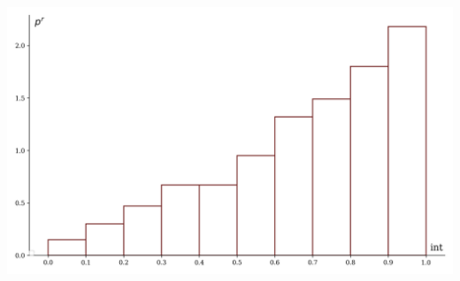 \documentclass[a4paper, 14pt]{extarticle}
\begin{document}
\begin{minipage}[t]{0.25\textwidth}
\includegraphics[width=\textwidth, height=\textheight, keepaspectratio]{sample28_hist}
\end{minipage}
\end{document}

